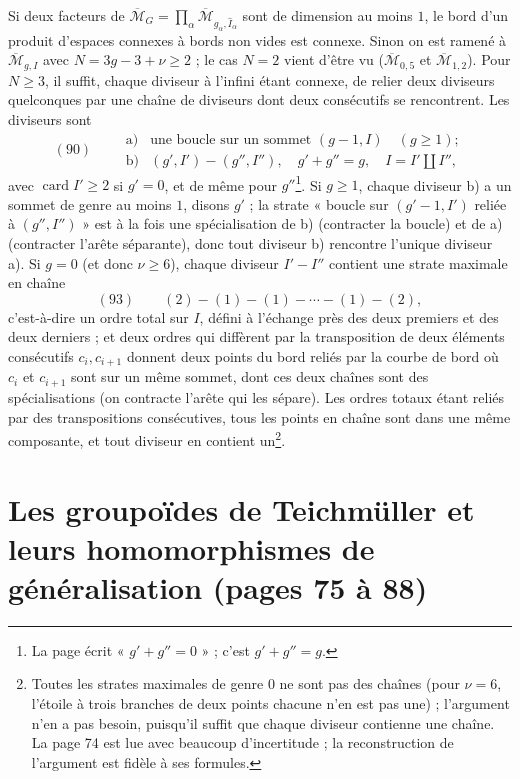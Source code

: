 \documentclass[11pt,a4paper]{article}
\begin{document}
Si deux facteurs de $\overline{\mathcal{M}}_G = \prod_\alpha
\overline{\mathcal{M}}_{g_\alpha, \widehat{I}_\alpha}$ sont de dimension au moins
$1$, le bord d'un produit d'espaces connexes à bords non vides est connexe. Sinon
on est ramené à $\overline{\mathcal{M}}_{g,I}$ avec $N = 3g - 3 + \nu \geq 2$ ; le
cas $N = 2$ vient d'être vu ($\overline{\mathcal{M}}_{0,5}$ et
$\overline{\mathcal{M}}_{1,2}$). Pour $N \geq 3$, il suffit, chaque diviseur à
l'infini étant connexe, de relier deux diviseurs quelconques par une chaîne de
diviseurs dont deux consécutifs se rencontrent. Les diviseurs sont
\[
(90) \qquad
\begin{array}{ll}
\text{a)} & \text{une boucle sur un sommet } (g - 1, I) \quad (g \geq 1) ; \\
\text{b)} & (g', I') - (g'', I''), \quad g' + g'' = g, \quad I = I' \amalg I'',
\end{array}
\]
avec $\operatorname{card} I' \geq 2$ si $g' = 0$, et de même pour
$g''$\footnote{La page écrit « $g' + g'' = 0$ » ; c'est $g' + g'' = g$.}. Si $g
\geq 1$, chaque diviseur b) a un sommet de genre au moins $1$, disons $g'$ ; la
strate « boucle sur $(g' - 1, I')$ reliée à $(g'', I'')$ » est à la fois une
spécialisation de b) (contracter la boucle) et de a) (contracter l'arête
séparante), donc tout diviseur b) rencontre l'unique diviseur a). Si $g = 0$
(et donc $\nu \geq 6$), chaque diviseur $I' - I''$ contient une strate maximale en
chaîne
\[
(93) \qquad (2) - (1) - (1) - \cdots - (1) - (2),
\]
c'est-à-dire un ordre total sur $I$, défini à l'échange près des deux premiers et
des deux derniers ; et deux ordres qui diffèrent par la transposition de deux
éléments consécutifs $c_i, c_{i+1}$ donnent deux points du bord reliés par la
courbe de bord où $c_i$ et $c_{i+1}$ sont sur un même sommet, dont ces deux
chaînes sont des spécialisations (on contracte l'arête qui les sépare). Les ordres
totaux étant reliés par des transpositions consécutives, tous les points en chaîne
sont dans une même composante, et tout diviseur en contient un\footnote{Toutes les
strates maximales de genre $0$ ne sont pas des chaînes (pour $\nu = 6$, l'étoile à
trois branches de deux points chacune n'en est pas une) ; l'argument n'en a pas
besoin, puisqu'il suffit que chaque diviseur contienne une chaîne. La page 74 est
lue avec beaucoup d'incertitude ; la reconstruction de l'argument est fidèle à
ses formules.}.

\section*{Les groupoïdes de Teichmüller et leurs homomorphismes de généralisation (pages 75 à 88)}
\end{document}
